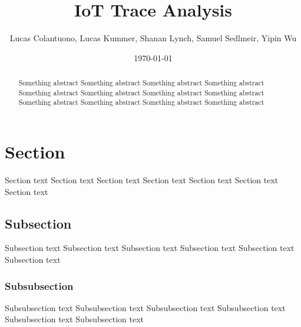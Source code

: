 \documentclass[11pt,final,a4paper,onecolumn,romanappendices]{IEEEtran}
\author{Lucas Colantuono, Lucas Kummer, Shanan Lynch, Samuel Sedlmeir, Yipin Wu}
\title{IoT Trace Analysis}
\date{\today}
\begin{document}
\maketitle
\newpage

\tableofcontents
\newpage

\begin{abstract}
Something abstract Something abstract Something abstract Something abstract Something abstract Something abstract Something abstract Something abstract Something abstract Something abstract Something abstract Something abstract 
\end{abstract}

\section{Section}
\label{sec:Section}
Section text Section text Section text Section text Section text Section text Section text
\subsection{Subsection}
Subsection text Subsection text Subsection text Subsection text Subsection text Subsection text
\subsubsection{Subsubsection}
Subsubsection text Subsubsection text Subsubsection text Subsubsection text Subsubsection text Subsubsection text
\end{document}
